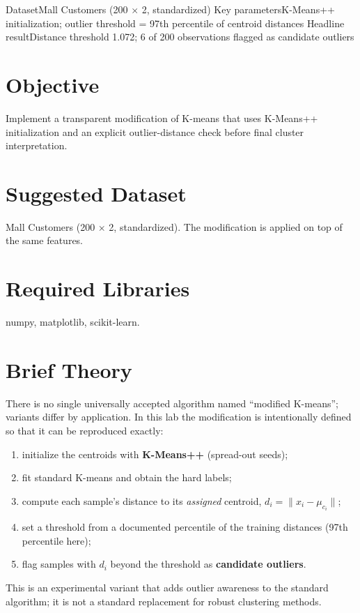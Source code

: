 
\quickfacts
  {Dataset}{Mall Customers (200 $\times$ 2, standardized)}
  {Key parameters}{K-Means++ initialization; outlier threshold = 97th percentile of centroid distances}
  {Headline result}{Distance threshold 1.072; 6 of 200 observations flagged as candidate outliers}

\section{Objective}
Implement a transparent modification of K-means that uses K-Means++ initialization and an
explicit outlier-distance check before final cluster interpretation.

\section{Suggested Dataset}
Mall Customers (200 $\times$ 2, standardized). The modification is applied on top of the same
features.

\section{Required Libraries}
numpy, matplotlib, scikit-learn.

\section{Brief Theory}
There is no single universally accepted algorithm named ``modified K-means''; variants
differ by application. In this lab the modification is intentionally defined so that it can
be reproduced exactly:
\begin{enumerate}
  \item initialize the centroids with \textbf{K-Means++} (spread-out seeds);
  \item fit standard K-means and obtain the hard labels;
  \item compute each sample's distance to its \emph{assigned} centroid,
        $d_i = \lVert x_i - \mu_{c_i} \rVert$;
  \item set a threshold from a documented percentile of the training distances
        (97th percentile here);
  \item flag samples with $d_i$ beyond the threshold as \textbf{candidate outliers}.
\end{enumerate}
This is an experimental variant that adds outlier awareness to the standard algorithm; it
is not a standard replacement for robust clustering methods.

